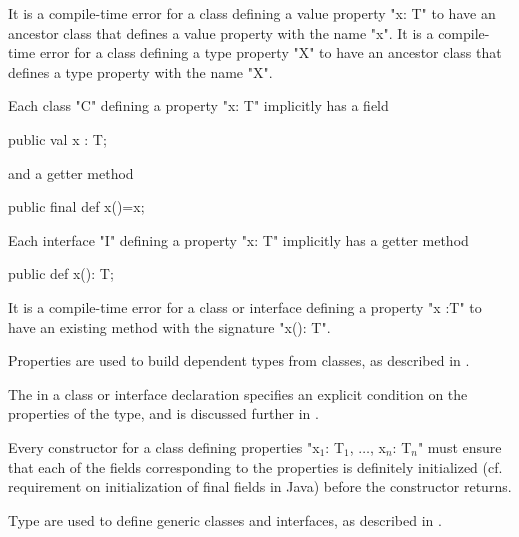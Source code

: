 \begin{staticrule*}
It is a compile-time error for a class
defining a value property \xcd"x: T" to have an ancestor class that defines
a value property with the name \xcd"x".  
\iftypeparams\else
It is a compile-time error for a class
defining a type property \xcd"X" to have an ancestor class that defines
a type property with the name \xcd"X".   
\fi
\end{staticrule*}

Each class \xcd"C" defining a property \xcd"x: T" implicitly has a field

\begin{xten}
public val x : T;
\end{xten} 

\noindent and a getter method

\begin{xten}
public final def x()=x;
\end{xten}

\noindent Each interface \xcd"I" defining a property \xcd"x: T"
implicitly has a getter method

\begin{xten}
public def x(): T;
\end{xten}

\begin{staticrule*}
It is a compile-time error for a class or
interface defining a property \xcd"x :T" to have an existing method with
the signature \xcd"x(): T".
\end{staticrule*}

Properties are used to build dependent types from classes, as
described in .

\label{ClassGuard}

The  in a class or interface declaration specifies an
explicit condition on the properties of the type, and is discussed further
in .

\begin{staticrule*}
     Every constructor for a class defining
   properties \xcdmath"x$_1$: T$_1$, $\ldots$, x$_n$: T$_n$" must ensure that each of the fields
   corresponding to the properties is definitely initialized
   (cf. requirement on initialization of final fields in Java) before the
   constructor returns.
\end{staticrule*}

Type \params{}
are used to define generic classes and
interfaces, as described in .

